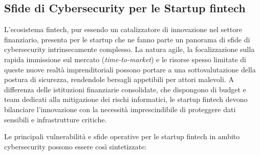 \subsection{Sfide di Cybersecurity per le Startup fintech}

L'ecosistema fintech, pur essendo un catalizzatore di innovazione nel settore finanziario, presenta per le startup che ne fanno parte un panorama di sfide di cybersecurity intrinsecamente complesso. La natura agile, la focalizzazione sulla rapida immissione sul mercato (\textit{time-to-market}) e le risorse spesso limitate di queste nuove realtà imprenditoriali possono portare a una sottovalutazione della postura di sicurezza, rendendole bersagli appetibili per attori malevoli. A differenza delle istituzioni finanziarie consolidate, che dispongono di budget e team dedicati alla mitigazione dei rischi informatici, le startup fintech devono bilanciare l'innovazione con la necessità imprescindibile di proteggere dati sensibili e infrastrutture critiche.

Le principali vulnerabilità e sfide operative per le startup fintech in ambito cybersecurity possono essere così sintetizzate:

